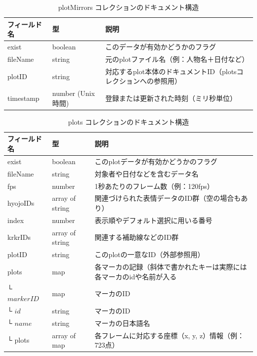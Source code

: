 \begin{table}[H]
  \centering
  \caption{plotMirrors コレクションのドキュメント構造}  
  \label{table:plotMirrors}
  \begin{tabular}{|l|l|p{8cm}|}
    \hline
    \bf フィールド名 & \bf 型 & \bf 説明 \\
    \hline
    exist & boolean & このデータが有効かどうかのフラグ \\
    fileName & string & 元のplotファイル名（例：人物名＋日付など） \\
    plotID & string & 対応するplot本体のドキュメントID（plotsコレクションへの参照用） \\
    timestamp & number (Unix時間) & 登録または更新された時刻（ミリ秒単位） \\
    \hline
  \end{tabular}
\end{table}
\begin{table}[H]
  \centering
  \caption{plots コレクションのドキュメント構造}    
  \label{table:plots}
  \begin{tabular}{|l|l|p{8cm}|}
    \hline
    \bf フィールド名 & \bf 型 & \bf 説明 \\
    \hline
    exist & boolean & このplotデータが有効かどうかのフラグ \\
    fileName & string & 対象者や日付などを含むデータ名 \\
    fps & number & 1秒あたりのフレーム数（例：120fps） \\
    hyojoIDs & array of string & 関連づけられた表情データのID群（空の場合もあり） \\
    index & number & 表示順やデフォルト選択に用いる番号 \\
    krkrIDs & array of string & 関連する補助線などのID群 \\
    plotID & string & このplotの一意なID（外部参照用） \\
    plots & map & 各マーカの記録（斜体で書かれたキーは実際には各マーカのidや名前が入る \\
    \quad └ $markerID$ & map & マーカのID \\
    \quad\quad └ $id$ & string & マーカのID \\
    \quad\quad └ $name$ & string & マーカの日本語名 \\
    \quad\quad └ plots & array of map & 各フレームに対応する座標（x, y, z）情報（例：723点） \\
    \hline
  \end{tabular}
\end{table}

